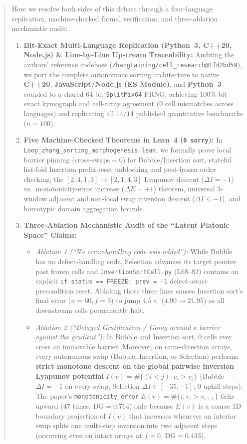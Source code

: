 \documentclass[11pt,a4paper]{article}
\theoremstyle{definition}
\theoremstyle{remark}
\newcommand{\DG}{\mathrm{DG}}
\begin{document}
\begin{abstract}
Here we resolve both sides of this debate through a four-language replication, machine-checked formal verification, and three-ablation mechanistic audit:
\begin{enumerate}
  \item \textbf{Bit-Exact Multi-Language Replication (Python~3, C++20, Node.js) \& Line-by-Line Upstream Traceability:} Auditing the authors' reference codebase (\texttt{Zhangtaining/cell\_research@1fd2bd59}), we port the complete autonomous sorting architecture to native \textbf{C++20}, \textbf{JavaScript/Node.js (ES Module)}, and \textbf{Python~3} coupled to a shared 64-bit \texttt{SplitMix64} PRNG, achieving $100\%$ bit-exact kymograph and cell-array agreement ($0$ cell mismatches across languages) and replicating all $14/14$ published quantitative benchmarks ($n = 100$).
  \item \textbf{Five Machine-Checked Theorems in Lean~4 (\texttt{0 sorry}):} In \texttt{Loop\_zhang\_sorting\_morphogenesis.lean}, we formally prove local barrier pinning ($\text{cross-swaps} = 0$) for Bubble/Insertion sort, stateful list-fold Insertion prefix-reset unblocking and post-frozen order checking, the $[2, 4, 1, 3] \to [2, 1, 4, 3]$ Lyapunov descent ($\Delta I = -1$) vs.\ monotonicity-error increase ($\Delta E = +1$) theorem, universal 3-window adjacent and non-local swap inversion descent ($\Delta I \le -1$), and homotypic domain aggregation bounds.
  \item \textbf{Three-Ablation Mechanistic Audit of the ``Latent Platonic Space'' Claims:}
  \begin{itemize}
    \item \emph{Ablation 1 (``No error-handling code was added''):} While Bubble has no defect-handling code, Selection advances its target pointer past frozen cells and \texttt{InsertionSortCell.py} (L68--82) contains an explicit \texttt{if status == FREEZE: prev = -1} defect-aware precondition reset. Ablating those three lines causes Insertion sort's final error ($n=60, f=3$) to jump $4.5\times$ ($4.90 \to 21.95$) as all downstream cells permanently halt.
    \item \emph{Ablation 2 (``Delayed Gratification / Going around a barrier against the gradient''):} In Bubble and Insertion sort, $0$ cells ever cross an immovable barrier. Moreover, on same-direction arrays, every autonomous swap (Bubble, Insertion, or Selection) performs \textbf{strict monotone descent on the global pairwise inversion Lyapunov potential} $I(v) = \#\{(i<j): v_i > v_j\}$ (Bubble $\Delta I = -1$ on every swap; Selection $\Delta I \in [-35, -1]$; $0$ uphill steps). The paper's \texttt{monotonicity\_error} $E(v) = \#\{i : v_i > v_{i+1}\}$ ticks upward ($47$ times, $\DG = 0.764$) only because $E(v)$ is a coarse 1D boundary projection of $I(v)$ that increases whenever an interior swap splits one multi-step inversion into two adjacent steps (occurring even on intact arrays at $f = 0$, $\DG = 0.433$).

\end{itemize}
\end{enumerate}
\end{abstract}
\end{document}
